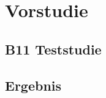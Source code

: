 \chapter{Vorstudie}\label{Vorstudie}
\section{B11 Teststudie}\label{B11 Teststudie}
\section{Ergebnis}\label{Ergebnis}
